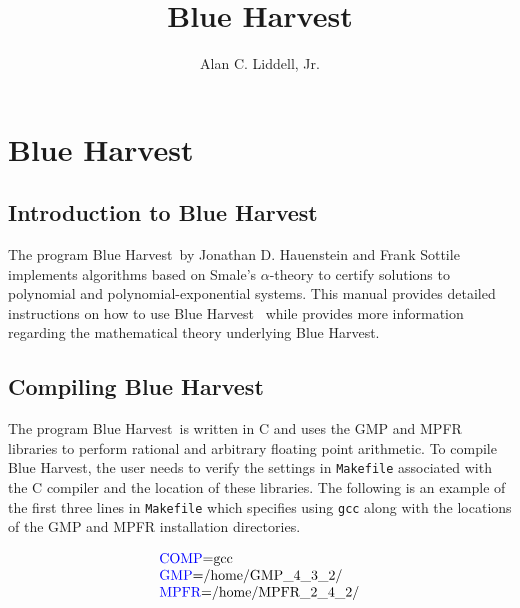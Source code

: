 \documentclass[11pt]{report}
\begin{document}
\newcommand{\bC}{{\mathbb C}}
\newcommand{\dhat}{{\hat d}}
\newcommand{\inputF}{{\tt input}}
\newcommand{\start}{{\tt start}}
\newcommand{\testPts}{{\tt test\_points}}
\newcommand{\outputF}{{\tt output}}
\newcommand{\localDim}{{\tt local\_dim}}
\newcommand{\blueharvest}{{Blue Harvest}}
\newcommand{\blueharvestS}{{\blueharvest~}}



\def\thesection{\arabic{section}}

\title{\blueharvest}
\author{Alan C. Liddell, Jr.}
\maketitle


\chapter*{\blueharvest}

\section{Introduction to \blueharvest}\label{CHAP:intro}

The program \blueharvestS by Jonathan D. Hauenstein and Frank Sottile
implements algorithms based on Smale's $\alpha$-theory to
certify solutions to polynomial and polynomial-exponential systems.
This manual provides detailed instructions on how to use \blueharvestS
while \cite{HS10,HL11} provides more information regarding the mathematical
theory underlying \blueharvest.

\section{Compiling \blueharvest}\label{CHAP:compile}

The program \blueharvestS is written in C and uses the GMP\cite{GMP} and MPFR\cite{MPFR} libraries
to perform rational and arbitrary floating point arithmetic.
To compile \blueharvest, the user needs to verify the settings in {\tt Makefile}
associated with the C compiler and the location of these libraries.
The following is an example of the first three lines in {\tt Makefile}
which specifies using {\tt gcc} along with the
locations of the GMP and MPFR installation directories.

$$\begin{array}{l}
\hbox{\begin{color}{blue}COMP\end{color}=gcc} \\
\hbox{\begin{color}{blue}GMP\end{color}=/home/GMP\_4\_3\_2/} \\
\hbox{\begin{color}{blue}MPFR\end{color}=/home/MPFR\_2\_4\_2/}
\end{array}$$
\end{document}
